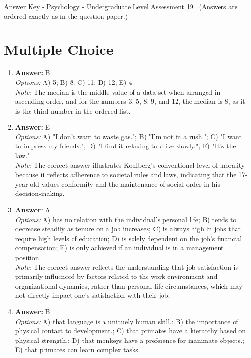 \documentclass[12pt]{article}
\begin{document}
\begin{center}
Answer Key - Psychology - Undergraduate Level Assessment 19 \
\small (Answers are ordered exactly as in the question paper.)
\end{center}

\section*{Multiple Choice}
\begin{enumerate}[label=\arabic*.]
\item \textbf{Answer:} B
\\ \textit{Options:} A) 5; B) 8; C) 11; D) 12; E) 4
\\ \textit{Note:} The median is the middle value of a data set when arranged in ascending order, and for the numbers 3, 5, 8, 9, and 12, the median is 8, as it is the third number in the ordered list.
\item \textbf{Answer:} E
\\ \textit{Options:} A) "I don't want to waste gas."; B) "I'm not in a rush."; C) "I want to impress my friends."; D) "I find it relaxing to drive slowly."; E) "It's the law."
\\ \textit{Note:} The correct answer illustrates Kohlberg's conventional level of morality because it reflects adherence to societal rules and laws, indicating that the 17-year-old values conformity and the maintenance of social order in his decision-making.
\item \textbf{Answer:} A
\\ \textit{Options:} A) has no relation with the individual's personal life; B) tends to decrease steadily as tenure on a job increases; C) is always high in jobs that require high levels of education; D) is solely dependent on the job's financial compensation; E) is only achieved if an individual is in a management position
\\ \textit{Note:} The correct answer reflects the understanding that job satisfaction is primarily influenced by factors related to the work environment and organizational dynamics, rather than personal life circumstances, which may not directly impact one's satisfaction with their job.
\item \textbf{Answer:} B
\\ \textit{Options:} A) that language is a uniquely human skill.; B) the importance of physical contact to development.; C) that primates have a hierarchy based on physical strength.; D) that monkeys have a preference for inanimate objects.; E) that primates can learn complex tasks.

\end{enumerate}
\end{document}

